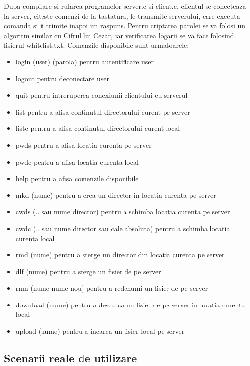 \documentclass[runningheads]{llncs}
\begin{document}
Dupa compilare si rularea programelor server.c si client.c, clientul se conecteaza la server, citeste comenzi de la tastatura, le transmite serverului, care executa comanda si ii trimite inapoi un raspuns. Pentru criptarea parolei se va folosi un algoritm similar cu Cifrul lui Cezar, iar verificarea logarii se va face folosind fisierul whitelist.txt. Comenzile disponibile sunt urmatoarele:
\begin{itemize}
    \item login (user) (parola) pentru autentificare user
    \item logout pentru deconectare user
    \item quit pentru intreruperea conexiunii clientului cu serverul
    \item list pentru a afisa continutul directorului curent pe server
    \item listc pentru a afisa continutul directorului curent local
    \item pwds pentru a afisa locatia curenta pe server
    \item pwdc pentru a afisa locatia curenta local
    \item help pentru a afisa comenzile disponibile
    \item mkd (nume) pentru a crea un director in locatia curenta pe server
    \item cwds (.. sau nume director) pentru a schimba locatia curenta pe server
    \item cwdc (.. sau nume director sau cale absoluta) pentru a schimba locatia curenta local
    \item rmd (nume) pentru a sterge un director din locatia curenta pe server
    \item dlf (nume) pentru a sterge un fisier de pe server
    \item rnm (nume nume nou) pentru a redenumi un fisier de pe server
    \item download (nume) pentru a descarca un fisier de pe server in locatia curenta local
    \item upload (nume) pentru a incarca un fisier local pe server
    
\end{itemize}

\subsection{Scenarii reale de utilizare}
\end{document}
